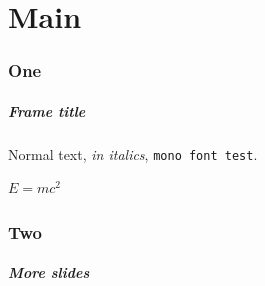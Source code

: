 \documentclass[nonavigation]{taltechslides}
\begin{document}
\maketitle

\part{Main}

\section{One}

\begin{frame}[fragile]
    \frametitle{Frame title}

    Normal text, \textit{in italics}, \texttt{mono font test}.

    \(E=mc^2\)

\end{frame}


{%
    \beamertemplatenavigationsymbolsempty
    \begin{frame}[plain]\end{frame}
}

\section{Two}

\begin{frame}[fragile]
    \frametitle{More slides}

    

\end{frame}
\end{document}

